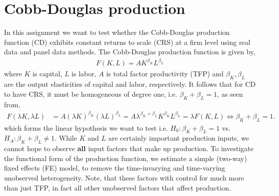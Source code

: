 \section{Cobb-Douglas production} \label{sec:intro}

In this assignment we want to test whether the Cobb-Douglas production function (CD) exhibits constant returns to scale (CRS) at a firm level using real data and panel data methods. The Cobb-Douglas production function is given by,
\begin{align*} \label{eq:CD}
    F(K,L) = A K^{\beta_K} L^{\beta_L}
\end{align*}
where $K$ is capital, $L$ is labor, $A$ is total factor productivity (TFP) and $\beta_K, \beta_L$ are the output elasticities of capital and labor, respectively.
It follows that for CD to have CRS, it must be homogeneous of degree one, i.e. $\beta_K + \beta_L = 1$, as seen from,
\begin{align*} 
    F(\lambda K, \lambda L) &= A (\lambda K)^{\beta_K} (\lambda L)^{\beta_L} = A \lambda^{\beta_K + \beta_L} K^{\beta_K} L^{\beta_L} = \lambda F(K,L) \iff \beta_K + \beta_L = 1.
\end{align*} 
which forms the linear hypothesis we want to test i.e. $H_0: \beta_K + \beta_L = 1$ vs. $H_A: \beta_K + \beta_L \neq 1$.
While $K$ and $L$ are certainly important production inputs, we cannot hope to observe \textbf{all} input factors that make up production. To investigate the functional form of the production function, we estimate a simple (two-way) fixed effects (FE) model, to remove the time-invarying and time-varying unobserved heterogeneity. Note, that these factors with control for much more than just TFP, in fact all other unobserved factors that affect production. 


